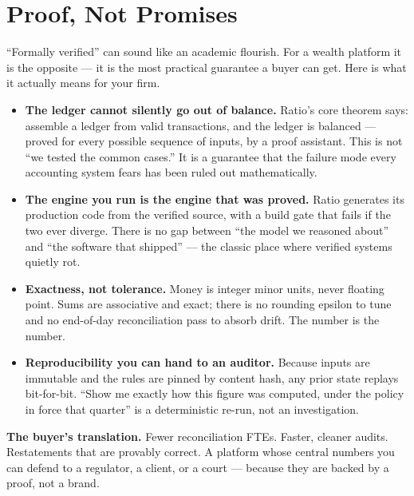 \section{Proof, Not Promises}

``Formally verified'' can sound like an academic flourish. For a wealth platform
it is the opposite --- it is the most practical guarantee a buyer can get. Here is
what it actually means for your firm.

\begin{itemize}
  \item \textbf{The ledger cannot silently go out of balance.} Ratio's core
  theorem says: assemble a ledger from valid transactions, and the ledger is
  balanced --- proved for every possible sequence of inputs, by a proof assistant.
  This is not ``we tested the common cases.'' It is a guarantee that the failure
  mode every accounting system fears has been ruled out mathematically.
  \item \textbf{The engine you run is the engine that was proved.} Ratio generates
  its production code from the verified source, with a build gate that fails if the
  two ever diverge. There is no gap between ``the model we reasoned about'' and
  ``the software that shipped'' --- the classic place where verified systems quietly
  rot.
  \item \textbf{Exactness, not tolerance.} Money is integer minor units, never
  floating point. Sums are associative and exact; there is no rounding epsilon to
  tune and no end-of-day reconciliation pass to absorb drift. The number is the
  number.
  \item \textbf{Reproducibility you can hand to an auditor.} Because inputs are
  immutable and the rules are pinned by content hash, any prior state replays
  bit-for-bit. ``Show me exactly how this figure was computed, under the policy in
  force that quarter'' is a deterministic re-run, not an investigation.
\end{itemize}

\begin{callout}
\sffamily\color{ratioInk}
\textbf{The buyer's translation.} Fewer reconciliation FTEs. Faster, cleaner
audits. Restatements that are provably correct. A platform whose central numbers
you can defend to a regulator, a client, or a court --- because they are backed by
a proof, not a brand.
\end{callout}
